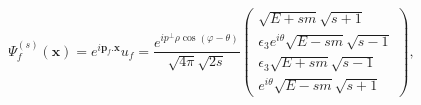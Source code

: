 \begin{equation}
\Psi _{f}^{\left( s\right) }(\mathbf{x})=e^{i\mathbf{p}_{f}.\mathbf{x}}u_{f}=%
\frac{e^{ip^{\bot }\rho \cos \left( \varphi -\theta \right)
}}{\sqrt{4\pi}\sqrt{2s}}\left(
\begin{array}{c}
\sqrt{E+sm}\sqrt{s+1} \\
\epsilon _{3}e^{i\theta }\sqrt{E-sm}\sqrt{s-1} \\
\epsilon _{3}\sqrt{E+sm}\sqrt{s-1} \\
e^{i\theta }\sqrt{E-sm}\sqrt{s+1}
\end{array}
\right) ,
\end{equation}

